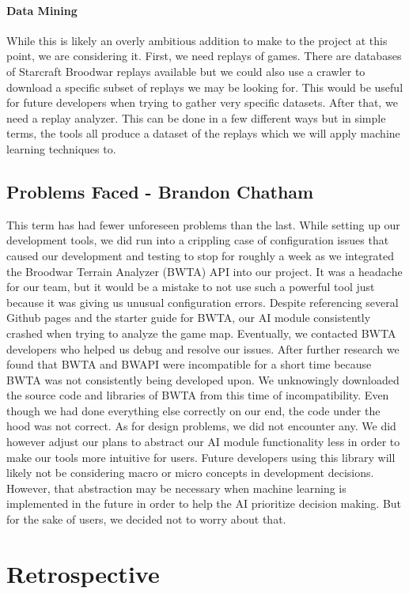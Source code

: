 \documentclass[10pt,letterpaper,onecolumn,draftclsnofoot]{IEEEtran}
\begin{document}
	\paragraph{Data Mining}
	While this is likely an overly ambitious addition to make to the project at this point, we are considering it. First, we need replays of games. There are databases of Starcraft Broodwar replays available but we could also use a crawler to download a specific subset of replays we may be looking for. This would be useful for future developers when trying to gather very specific datasets. After that, we need a replay analyzer. This can be done in a few different ways but in simple terms, the tools all produce a dataset of the replays which we will apply machine learning techniques to.
	
	\subsection{Problems Faced - Brandon Chatham}
	This term has had fewer unforeseen problems than the last. While setting up our development tools, we did run into a crippling case of configuration issues that caused our development and testing to stop for roughly a week as we integrated the Broodwar Terrain Analyzer (BWTA) API into our project. It was a headache for our team, but it would be a mistake to not use such a powerful tool just because it was giving us unusual configuration errors. Despite referencing several Github pages and the starter guide for BWTA, our AI module consistently crashed when trying to analyze the game map. Eventually, we contacted BWTA developers who helped us debug and resolve our issues. After further research we found that BWTA and BWAPI were incompatible for a short time because BWTA was not consistently being developed upon. We unknowingly downloaded the source code and libraries of BWTA from this time of incompatibility. Even though we had done everything else correctly on our end, the code under the hood was not correct.
	As for design problems, we did not encounter any. We did however adjust our plans to abstract our AI module functionality less in order to make our tools more intuitive for users. Future developers using this library will likely not be considering macro or micro concepts in development decisions. However, that abstraction may be necessary when machine learning is implemented in the future in order to help the AI prioritize decision making. But for the sake of users, we decided not to worry about that. 
	
	\section{Retrospective}

	
\end{document}
